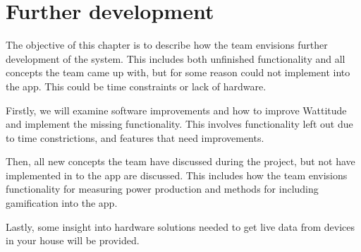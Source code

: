 \chapter{Further development}
\label{sec:further}

The objective of this chapter is to describe how the team envisions further development of the system. This includes both unfinished functionality and all concepts the team came up with, but for some reason could not implement into the app. This could be time constraints or lack of hardware.

Firstly, we will examine software improvements and how to improve Wattitude and implement the missing functionality. This involves functionality left out due to time constrictions, and features that need improvements. 

Then, all new concepts the team have discussed during the project, but not have implemented in to the app are discussed. This includes how the team envisions functionality for measuring power production and methods for including gamification into the app. 

Lastly, some insight into hardware solutions needed to get live data from devices in your house will be provided. 



